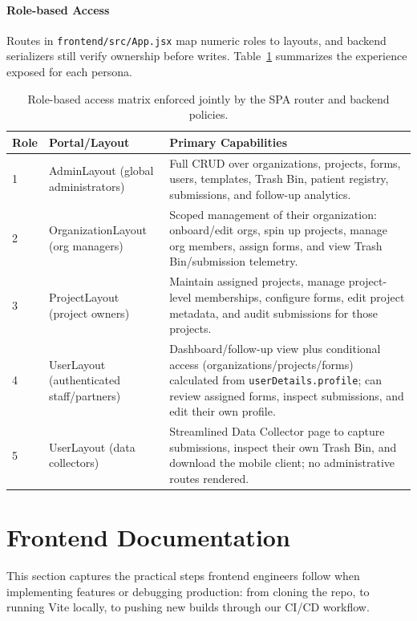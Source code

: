 \documentclass[11pt]{article}
\begin{document}
\paragraph{Role-based Access}
Routes in \verb|frontend/src/App.jsx| map numeric roles to layouts, and backend serializers still verify ownership before writes. Table~\ref{tab:rbac} summarizes the experience exposed for each persona.

\begin{table}[H]
  \centering
  \small
  \begin{tabular}{p{1.2cm}p{3.5cm}p{8cm}}
    \toprule
    \textbf{Role} & \textbf{Portal/Layout} & \textbf{Primary Capabilities} \\
    \midrule
    1 & AdminLayout (global administrators) & Full CRUD over organizations, projects, forms, users, templates, Trash Bin, patient registry, submissions, and follow-up analytics. \\
    2 & OrganizationLayout (org managers) & Scoped management of their organization: onboard/edit orgs, spin up projects, manage org members, assign forms, and view Trash Bin/submission telemetry. \\
    3 & ProjectLayout (project owners) & Maintain assigned projects, manage project-level memberships, configure forms, edit project metadata, and audit submissions for those projects. \\
    4 & UserLayout (authenticated staff/partners) & Dashboard/follow-up view plus conditional access (organizations/projects/forms) calculated from \verb|userDetails.profile|; can review assigned forms, inspect submissions, and edit their own profile. \\
    5 & UserLayout (data collectors) & Streamlined Data Collector page to capture submissions, inspect their own Trash Bin, and download the mobile client; no administrative routes rendered. \\
    \bottomrule
  \end{tabular}
  \caption{Role-based access matrix enforced jointly by the SPA router and backend policies.}
  \label{tab:rbac}
\end{table}

\section{Frontend Documentation}
\noindent This section captures the practical steps frontend engineers follow when implementing features or debugging production: from cloning the repo, to running Vite locally, to pushing new builds through our CI/CD workflow.
\end{document}
